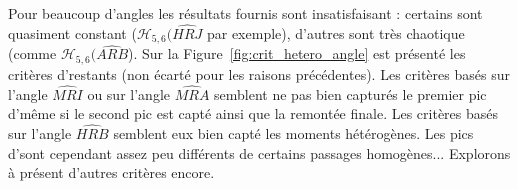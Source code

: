 \documentclass[main.tex]{subfiles}
\begin{document}
Pour beaucoup d'angles les résultats fournis sont insatisfaisant : certains sont quasiment constant ($\mathcal{H}_{5,6}(\widehat{HRJ}$ par exemple), d'autres sont très chaotique (comme $\mathcal{H}_{5,6}(\widehat{ARB}$). Sur la Figure~\ref{fig:crit_hetero_angle} est présenté les critères d'\hetero restants (\ie non écarté pour les raisons précédentes). 
Les critères basés sur l'angle $\widehat{MRI}$ ou sur l'angle $\widehat{MRA}$ semblent ne pas bien capturés le premier pic d'\hetero même si le second pic est capté ainsi que la remontée finale. Les critères basés sur l'angle $\widehat{HRB}$ semblent eux bien capté les moments hétérogènes. Les pics d'\hetero sont cependant %
assez peu différents de certains passages homogènes... 
Explorons à présent d'autres critères encore.
\end{document}
